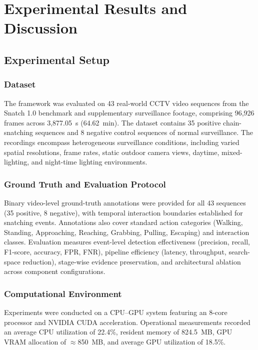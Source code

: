 \section{Experimental Results and Discussion}

\subsection{Experimental Setup}

\subsubsection{Dataset}

The framework was evaluated on 43 real-world CCTV video sequences from the Snatch 1.0 benchmark and supplementary surveillance footage, comprising 96,926 frames across 3,877.05~s (64.62~min). The dataset contains 35 positive chain-snatching sequences and 8 negative control sequences of normal surveillance. The recordings encompass heterogeneous surveillance conditions, including varied spatial resolutions, frame rates, static outdoor camera views, daytime, mixed-lighting, and night-time lighting environments.

\subsubsection{Ground Truth and Evaluation Protocol}

Binary video-level ground-truth annotations were provided for all 43 sequences (35 positive, 8 negative), with temporal interaction boundaries established for snatching events. Annotations also cover standard action categories (Walking, Standing, Approaching, Reaching, Grabbing, Pulling, Escaping) and interaction classes. Evaluation measures event-level detection effectiveness (precision, recall, F1-score, accuracy, FPR, FNR), pipeline efficiency (latency, throughput, search-space reduction), stage-wise evidence preservation, and architectural ablation across component configurations.

\subsubsection{Computational Environment}

Experiments were conducted on a CPU--GPU system featuring an 8-core processor and NVIDIA CUDA acceleration. Operational measurements recorded an average CPU utilization of 22.4\%, resident memory of 824.5~MB, GPU VRAM allocation of $\approx$850~MB, and average GPU utilization of 18.5\%.

